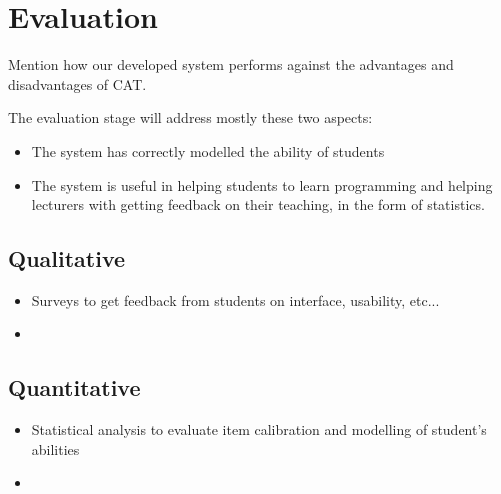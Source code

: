 \documentclass[11pt,a4paper]{report}
\begin{document}









\chapter{Evaluation}
Mention how our developed system performs against the advantages and disadvantages of CAT.

The evaluation stage will address mostly these two aspects:
\begin{itemize}
\item The system has correctly modelled the ability of students
\item The system is useful in helping students to learn programming and helping lecturers with getting feedback on their teaching, in the form of statistics.
\end{itemize}

\section{Qualitative}
\begin{itemize}
\item Surveys to get feedback from students on interface, usability, etc...
\item 
\end{itemize}

\section{Quantitative}
\begin{itemize}
\item Statistical analysis to evaluate item calibration and modelling of student's abilities
\item 
\end{itemize}
\end{document}
